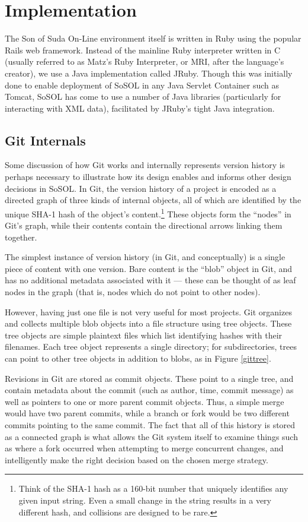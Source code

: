 \documentclass[]{article}
\begin{document}
\section*{Implementation}

The Son of Suda On-Line environment itself is written in Ruby using the popular Rails web framework. Instead of the mainline Ruby interpreter written in C (usually referred to as Matz's Ruby Interpreter, or MRI, after the language's creator), we use a Java implementation called JRuby. Though this was initially done to enable deployment of SoSOL in any Java Servlet Container such as Tomcat, SoSOL has come to use a number of Java libraries (particularly for interacting with XML data), facilitated by JRuby's tight Java integration.

\subsection*{Git Internals}

Some discussion of how Git works and internally represents version history is perhaps necessary to illustrate how its design enables and informs other design decisions in SoSOL. In Git, the version history of a project is encoded as a directed graph of three kinds of internal objects, all of which are identified by the unique SHA-1 hash of the object's content.\footnote{Think of the SHA-1 hash as a 160-bit number that uniquely identifies any given input string. Even a small change in the string results in a very different hash, and collisions are designed to be rare.} These objects form the “nodes” in Git's graph, while their contents contain the directional arrows linking them together.

The simplest instance of version history (in Git, and conceptually) is a single piece of content with one version. Bare content is the “blob” object in Git, and has no additional metadata associated with it — these can be thought of as leaf nodes in the graph (that is, nodes which do not point to other nodes).

However, having just one file is not very useful for most projects. Git organizes and collects multiple blob objects into a file structure using tree objects. These tree objects are simple plaintext files which list identifying hashes with their filenames. Each tree object represents a single directory; for subdirectories, trees can point to other tree objects in addition to blobs, as in Figure \ref{gittree}.

Revisions in Git are stored as commit objects. These point to a single tree, and contain metadata about the commit (such as author, time, commit message) as well as pointers to one or more parent commit objects. Thus, a simple merge would have two parent commits, while a branch or fork would be two different commits pointing to the same commit. The fact that all of this history is stored as a connected graph is what allows the Git system itself to examine things such as where a fork occurred when attempting to merge concurrent changes, and intelligently make the right decision based on the chosen merge strategy.
\end{document}
